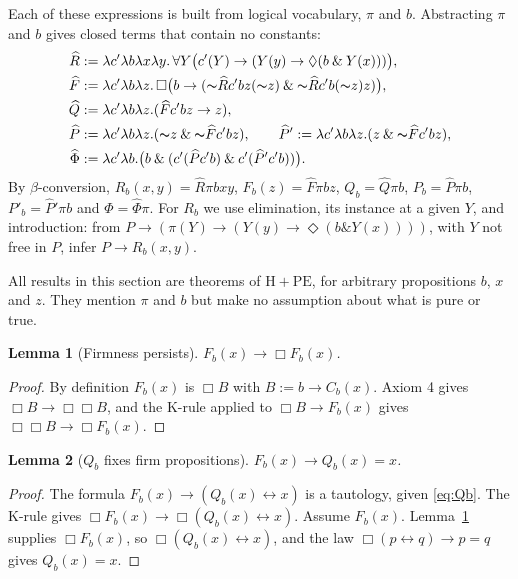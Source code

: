 \documentclass[12pt,leqno]{article}
\newcommand{\AND}{\ensuremath{\mathbin{\&}}}
\newcommand{\IFF}{\ensuremath{\leftrightarrow}}
\newcommand{\IC}{\ensuremath{\rightarrow}}
\newcommand{\NOT}{\ensuremath{\text{$\thicksim$}}}
\newcommand{\HPE}{\ensuremath{\mathrm{H}+\mathrm{PE}}}
\newcommand{\hR}{\ensuremath{\widehat{R}}}
\newcommand{\hF}{\ensuremath{\widehat{F}}}
\newcommand{\hQ}{\ensuremath{\widehat{Q}}}
\newcommand{\hP}{\ensuremath{\widehat{P}}}
\newcommand{\hPp}{\ensuremath{\widehat{P}'}}
\newcommand{\hPhi}{\ensuremath{\widehat{\Phi}}}
\theoremstyle{plain}
\newtheorem{lemma}{Lemma}
\begin{document}
Each of these expressions is built from logical vocabulary, \(\pi\) and
\(b\). Abstracting \(\pi\) and \(b\) gives closed terms that contain no
constants:
\begin{align*}
 \hR&:=\lambda c'\lambda b\lambda x\lambda y.\,
   \forall Y\bigl(c'(Y)\IC(Y(y)\IC\Diamond(b\AND Y(x)))\bigr),\\
 \hF&:=\lambda c'\lambda b\lambda z.\,
   \Box\bigl(b\IC(\NOT\hR c'bz(\NOT z)\AND\NOT\hR c'b(\NOT z)z)\bigr),\\
 \hQ&:=\lambda c'\lambda b\lambda z.(\hF c'bz\IC z),\\
 \hP&:=\lambda c'\lambda b\lambda z.(\NOT z\AND\NOT\hF c'bz),\qquad
 \hPp:=\lambda c'\lambda b\lambda z.(z\AND\NOT\hF c'bz),\\
 \hPhi&:=\lambda c'\lambda b.\bigl(b\AND(c'(\hP c'b)\AND c'(\hPp c'b))\bigr).
\end{align*}
By \(\beta\)-conversion, \(R_b(x,y)=\hR\pi bxy\), \(F_b(z)=\hF\pi bz\),
\(Q_b=\hQ\pi b\), \(P_b=\hP\pi b\), \(P'_b=\hPp\pi b\) and
\(\Phi=\hPhi\pi\). For \(R_b\) we use elimination, its instance at a
given \(Y\), and introduction: from
\(P\IC(\pi(Y)\IC(Y(y)\IC\Diamond(b\AND Y(x))))\), with \(Y\) not free
in \(P\), infer \(P\IC R_b(x,y)\).

All results in this section are theorems of \HPE, for arbitrary
propositions \(b\), \(x\) and \(z\). They mention \(\pi\) and \(b\) but
make no assumption about what is pure or true.

\begin{lemma}[Firmness persists]\label{lem:A}
\(F_b(x)\IC\Box F_b(x)\).
\end{lemma}
\begin{proof}
By definition \(F_b(x)\) is \(\Box B\) with \(B:=b\IC C_b(x)\). Axiom 4
gives \(\Box B\IC\Box\Box B\), and the K-rule applied to
\(\Box B\IC F_b(x)\) gives \(\Box\Box B\IC\Box F_b(x)\).
\end{proof}

\begin{lemma}[\(Q_b\) fixes firm propositions]\label{lem:B}
\(F_b(x)\IC Q_b(x)=x\).
\end{lemma}
\begin{proof}
The formula \(F_b(x)\IC(Q_b(x)\IFF x)\) is a tautology, given
\eqref{eq:Qb}. The K-rule gives
\(\Box F_b(x)\IC\Box(Q_b(x)\IFF x)\). Assume \(F_b(x)\).
Lemma~\ref{lem:A} supplies \(\Box F_b(x)\), so
\(\Box(Q_b(x)\IFF x)\), and the law \(\Box(p\IFF q)\IC p=q\) gives
\(Q_b(x)=x\).
\end{proof}
\end{document}
